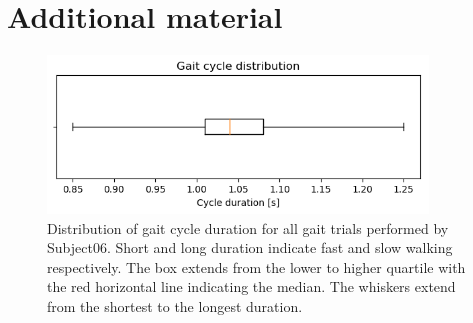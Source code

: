 

\chapter{Additional material}



\begin{figure}
    \centering
    \includegraphics[width=0.9\textwidth]{img/results/20190429_06_gait_cycle_duration_quart.png}
    \caption{Distribution of gait cycle duration for all gait trials performed by Subject06. Short and long duration indicate fast and slow walking respectively. The box extends from the lower to higher quartile with the red horizontal line indicating the median. The whiskers extend from the shortest to the longest duration.}
    \label{fig:subject06-gait-cycle-dist}
\end{figure}